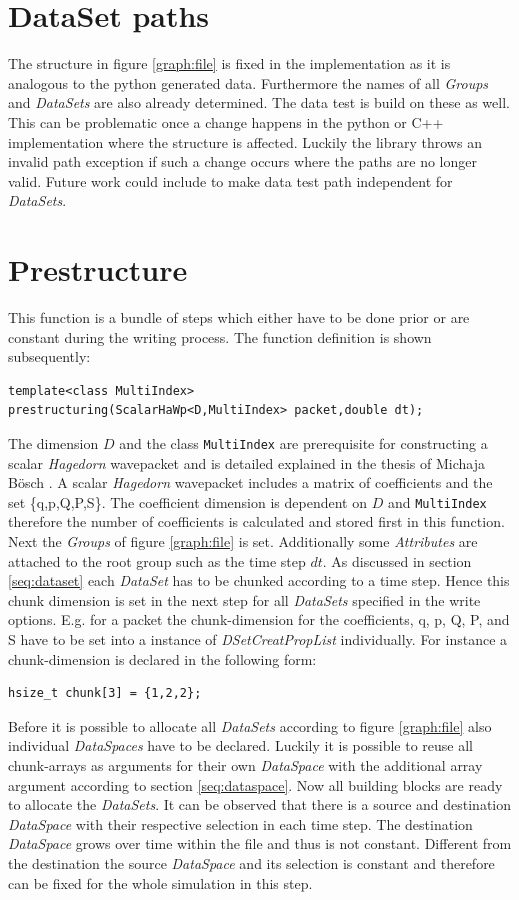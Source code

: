 \section{DataSet paths}
The structure in figure \ref{graph:file} is fixed in the implementation as it is analogous to the python generated data. Furthermore the names of all \textit{Groups} and \textit{DataSets} are also already determined. The data test is build on these as well. This can be problematic once a change happens in the python or C++ implementation where the structure is affected. Luckily the library throws an invalid path exception if such a change occurs where the paths are no longer valid. Future work could include to make data test path independent for \textit{DataSets}.

\section{Prestructure}
This function is a bundle of steps which either have to be done prior or are constant during the writing process. The function definition is shown subsequently:
\begin{lstlisting}
template<class MultiIndex>
prestructuring(ScalarHaWp<D,MultiIndex> packet,double dt);
\end{lstlisting}
The dimension $D$ and the class \texttt{MultiIndex} are prerequisite for constructing a scalar \textit{Hagedorn} wavepacket and is detailed explained in the thesis of Michaja B\"osch \cite{bt_michajab}. A scalar \textit{Hagedorn} wavepacket includes a matrix of coefficients and the set \{q,p,Q,P,S\}. The coefficient dimension is dependent on $D$ and \texttt{MultiIndex} therefore the number of coefficients is calculated and stored first in this function. Next the \textit{Groups} of figure \ref{graph:file} is set. Additionally some \textit{Attributes} are attached to the root group such as the time step $dt$. As discussed in section \ref{seq:dataset} each \textit{DataSet} has to be chunked according to a time step. Hence this chunk dimension is set in the next step for all \textit{DataSets} specified in the write options. E.g. for a packet the chunk-dimension for the coefficients, q, p, Q, P, and S have to be set into a instance of \textit{DSetCreatPropList} individually. 
For instance a chunk-dimension is declared in the following form:
\begin{lstlisting}
hsize_t chunk[3] = {1,2,2};
\end{lstlisting}
Before it is possible to allocate all \textit{DataSets} according to figure \ref{graph:file} also individual \textit{DataSpaces} have to be declared. Luckily it is possible to reuse all chunk-arrays as arguments for their own \textit{DataSpace} with the additional array argument according to section \ref{seq:dataspace}. Now all building blocks are ready to allocate the \textit{DataSets}. It can be observed that there is a source and destination \textit{DataSpace} with their respective selection in each time step. The destination \textit{DataSpace} grows over time within the file and thus is not constant. Different from the destination the source \textit{DataSpace} and its selection is constant and therefore can be fixed for the whole simulation in this step. 

